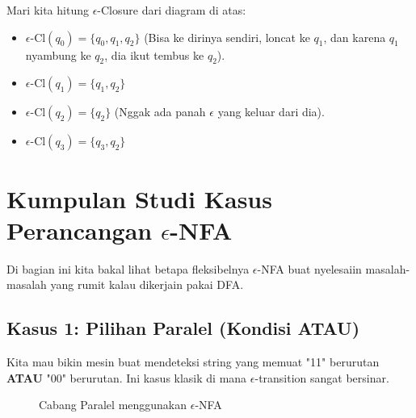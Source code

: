 \documentclass[12pt,a4paper]{article}
\begin{document}
Mari kita hitung $\epsilon$-Closure dari diagram di atas:
\begin{itemize}
    \item $\epsilon\text{-Cl}(q_0) = \{q_0, q_1, q_2\}$ (Bisa ke dirinya sendiri, loncat ke $q_1$, dan karena $q_1$ nyambung ke $q_2$, dia ikut tembus ke $q_2$).
    \item $\epsilon\text{-Cl}(q_1) = \{q_1, q_2\}$
    \item $\epsilon\text{-Cl}(q_2) = \{q_2\}$ (Nggak ada panah $\epsilon$ yang keluar dari dia).
    \item $\epsilon\text{-Cl}(q_3) = \{q_3, q_2\}$
\end{itemize}

\newpage
\section{Kumpulan Studi Kasus Perancangan $\epsilon$-NFA}

Di bagian ini kita bakal lihat betapa fleksibelnya $\epsilon$-NFA buat nyelesaiin masalah-masalah yang rumit kalau dikerjain pakai DFA.

\subsection{Kasus 1: Pilihan Paralel (Kondisi ATAU)}
Kita mau bikin mesin buat mendeteksi string yang memuat "11" berurutan \textbf{ATAU} "00" berurutan. Ini kasus klasik di mana $\epsilon$-transition sangat bersinar.

\begin{figure}[h]
    \centering
    \caption{Cabang Paralel menggunakan $\epsilon$-NFA}
\end{figure}
\end{document}
